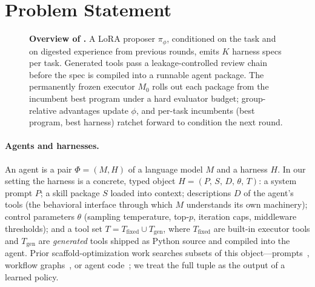 \section{Problem Statement}
\label{sec:problem}

\begin{figure}[t]
\centering
\caption{\textbf{Overview of \method{}.}  A LoRA proposer $\pi_\phi$,
conditioned on the task and on digested experience from previous rounds,
emits $K$ harness specs per task.  Generated tools pass a leakage-controlled
review chain before the spec is compiled into a runnable agent package.  The
permanently frozen executor $M_0$ rolls out each package from the incumbent
best program under a hard evaluator budget; group-relative advantages update
$\phi$, and per-task incumbents (best program, best harness) ratchet forward
to condition the next round.}
\label{fig:overview}
\end{figure}

\paragraph{Agents and harnesses.}  An agent is a pair $\Phi = (M, H)$ of a
language model $M$ and a harness $H$.  In our setting the harness is a
concrete, typed object
$H = (P,\, S,\, D,\, \theta,\, T)$: a system prompt $P$; a skill package $S$
loaded into context; descriptions $D$ of the agent's tools (the behavioral
interface through which $M$ understands its own machinery); control
parameters $\theta$ (sampling temperature, top-$p$, iteration caps,
middleware thresholds); and a tool set $T = T_{\mathrm{fixed}} \cup
T_{\mathrm{gen}}$, where $T_{\mathrm{fixed}}$ are built-in executor tools and
$T_{\mathrm{gen}}$ are \emph{generated} tools shipped as Python source and
compiled into the agent.  Prior scaffold-optimization work searches subsets
of this object---prompts~\citep{opro,gepa}, workflow
graphs~\citep{aflow,agentsquare}, or agent code~\citep{adas,dgm}; we treat
the full tuple as the output of a learned policy.

